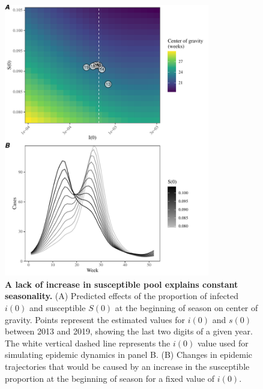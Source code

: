\documentclass[12pt]{article}
\begin{document}
\begin{figure}[!pth]
\begin{center}
\includegraphics[width=0.8\textwidth]{../figure/figure_ryukyu_sirs_change.pdf}
\caption{
\textbf{A lack of increase in susceptible pool explains constant seasonality.}
(A) Predicted effects of the proportion of infected $i(0)$ and susceptible $S(0)$ at the beginning of season on center of gravity.
Points represent the estimated values for $i(0)$ and $s(0)$ between 2013 and 2019, showing the last two digits of a given year.
The white vertical dashed line represents the $i(0)$ value used for simulating epidemic dynamics in panel B.
(B) Changes in epidemic trajectories that would be caused by an increase in the susceptible proportion at the beginning of season for a fixed value of $i(0)$.
}
\end{center}
\end{figure}

\pagebreak


\end{document}
